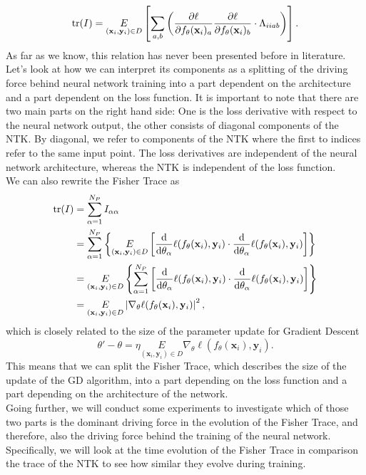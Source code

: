 \begin{equation}\label{eq:FisherNTKRelation}
	\mathrm{tr}(I) = \underset{(\mathbf{x}_i, \mathbf{y}_i) \in D}{E} \left[\sum_{a,b} \left(\frac{\partial\ell}{\partial f_\theta(\mathbf{x}_i)_a}\frac{\partial\ell}{\partial f_\theta(\mathbf{x}_i)_b} \cdot \Lambda_{iiab}\right)\right].
\end{equation}
As far as we know, this relation has never been presented before in literature. Let's look at how we can interpret 
its components as a splitting of the driving force behind neural network training into a part dependent on the architecture and a part dependent on the loss function. It is important to note that there are two main parts on the right hand side: One is the loss derivative with respect to the neural network output, the other consists of diagonal components of the NTK. By diagonal, we refer to components of the NTK where the first to indices refer to the same input point. The loss derivatives are independent of the neural network architecture, whereas the NTK is independent of the loss function.\\
We can also rewrite the Fisher Trace as
\begin{equation}
	\begin{split}
		\mathrm{tr}(I) &= \sum_{\alpha = 1}^{N_P} I_{\alpha\alpha}\\
		&= \sum_{\alpha = 1}^{N_P} \left\{\underset{(\mathbf{x}_i, \mathbf{y}_i) \in D}{E} \left[\frac{\mathrm{d}}{\mathrm{d}\theta_\alpha}\ell(f_\theta(\mathbf{x}_i),\mathbf{y}_i)\cdot \frac{\mathrm{d}}{\mathrm{d}\theta_\alpha}\ell(f_\theta(\mathbf{x}_i),\mathbf{y}_i)\right]\right\}\\
		&= \underset{(\mathbf{x}_i, \mathbf{y}_i) \in D}{E} \left\{\sum_{\alpha = 1}^{N_P} \left[\frac{\mathrm{d}}{\mathrm{d}\theta_\alpha}\ell(f_\theta(\mathbf{x}_i),\mathbf{y}_i)\cdot \frac{\mathrm{d}}{\mathrm{d}\theta_\alpha}\ell(f_\theta(\mathbf{x}_i),\mathbf{y}_i)\right]\right\}\\
		&= \underset{(\mathbf{x}_i, \mathbf{y}_i) \in D}{E} \left|\nabla_\theta \ell(f_\theta(\mathbf{x}_i),\mathbf{y}_i) \right|^2,
	\end{split}
\end{equation}
which is closely related to the size of the parameter update for Gradient Descent
\begin{equation}
	\theta' - \theta =  \eta \underset{(\mathbf{x}_i, \mathbf{y}_i) \in D}{E} \nabla_\theta \ell(f_\theta(\mathbf{x}_i),\mathbf{y}_i).
\end{equation}
This means that we can split the Fisher Trace, which describes the size of the update of the GD algorithm, into a part depending on the loss function and a part depending on the architecture of the network.\\
Going further, we will conduct some experiments to investigate which of those two parts is the dominant driving force in the evolution of the Fisher Trace, and therefore, also the driving force behind the training of the neural network. Specifically, we will look at the time evolution of the Fisher Trace in comparison the trace of the NTK to see how similar they evolve during training.

